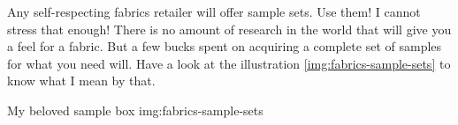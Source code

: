 Any self-respecting fabrics retailer will offer sample sets. Use them! I cannot stress that enough! There is no amount of research in the world that will give you a feel for a fabric. But a few bucks spent on acquiring a complete set of samples for what you need will. Have a look at the illustration \ref{img:fabrics-sample-sets} to know what I mean by that.

{My beloved sample box}
{img:fabrics-sample-sets}
